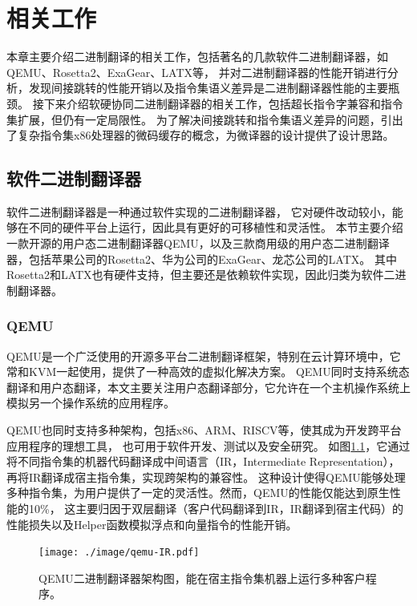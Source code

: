 \chapter{相关工作}\label{chap:related_work}

本章主要介绍二进制翻译的相关工作，包括著名的几款软件二进制翻译器，如QEMU、Rosetta2、ExaGear、LATX等，
并对二进制翻译器的性能开销进行分析，发现间接跳转的性能开销以及指令集语义差异是二进制翻译器性能的主要瓶颈。
接下来介绍软硬协同二进制翻译器的相关工作，包括超长指令字兼容和指令集扩展，但仍有一定局限性。
为了解决间接跳转和指令集语义差异的问题，引出了复杂指令集x86处理器的微码缓存的概念，为微译器的设计提供了设计思路。

\section{软件二进制翻译器}

软件二进制翻译器是一种通过软件实现的二进制翻译器，
它对硬件改动较小，能够在不同的硬件平台上运行，因此具有更好的可移植性和灵活性。
本节主要介绍一款开源的用户态二进制翻译器QEMU，以及三款商用级的用户态二进制翻译器，包括苹果公司的Rosetta2、华为公司的ExaGear、龙芯公司的LATX。
其中Rosetta2和LATX也有硬件支持，但主要还是依赖软件实现，因此归类为软件二进制翻译器。

\subsection{QEMU}

QEMU是一个广泛使用的开源多平台二进制翻译框架，特别在云计算环境中，它常和KVM一起使用，提供了一种高效的虚拟化解决方案。
QEMU同时支持系统态翻译和用户态翻译，本文主要关注用户态翻译部分，它允许在一个主机操作系统上模拟另一个操作系统的应用程序。

QEMU也同时支持多种架构，包括x86、ARM、RISCV等，使其成为开发跨平台应用程序的理想工具， 也可用于软件开发、测试以及安全研究。
如图\ref{img:qemu_arch}，它通过将不同指令集的机器代码翻译成中间语言（IR，Intermediate Representation），再将IR翻译成宿主指令集，实现跨架构的兼容性。
这种设计使得QEMU能够处理多种指令集，为用户提供了一定的灵活性。然而，QEMU的性能仅能达到原生性能的10\%，
这主要归因于双层翻译（客户代码翻译到IR，IR翻译到宿主代码）的性能损失以及Helper函数模拟浮点和向量指令的性能开销\cite{deflater}。

\begin{figure}[!htbp]
  \centering
  \texttt{[image: ./image/qemu-IR.pdf]}
  \caption{QEMU二进制翻译器架构图，能在宿主指令集机器上运行多种客户程序。}
  \label{img:qemu_arch}
\end{figure}

